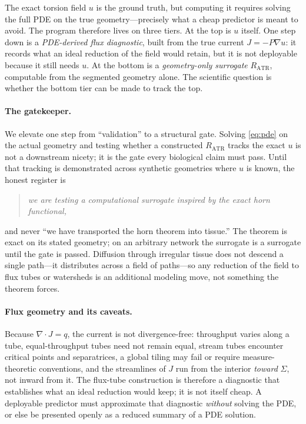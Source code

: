 \documentclass[11pt]{article}
\theoremstyle{remark}
\newcommand{\Sig}{\Sigma}
\newcommand{\RATR}{R_{\mathrm{ATR}}}
\begin{document}
The exact torsion field $u$ is the ground truth, but computing it requires solving
the full PDE on the true geometry---precisely what a cheap predictor is meant to
avoid. The program therefore lives on three tiers. At the top is $u$ itself. One
step down is a \emph{PDE-derived flux diagnostic}, built from the true current
$J=-P\nabla u$: it records what an ideal reduction of the field would retain, but
it is not deployable because it still needs $u$. At the bottom is a
\emph{geometry-only surrogate} $\RATR$, computable from the segmented geometry
alone. The scientific question is whether the bottom tier can be made to track the
top.

\paragraph{The gatekeeper.} We elevate one step from ``validation'' to a
structural gate. Solving \eqref{eq:pde} on the actual geometry and testing whether
a constructed $\RATR$ tracks the exact $u$ is not a downstream nicety; it is the
gate every biological claim must pass. Until that tracking is demonstrated across
synthetic geometries where $u$ is known, the honest register is
\begin{quote}
\emph{we are testing a computational surrogate inspired by the exact horn
functional,}
\end{quote}
and never ``we have transported the horn theorem into tissue.'' The theorem is
exact on its stated geometry; on an arbitrary network the surrogate is a surrogate
until the gate is passed. Diffusion through irregular tissue does not descend a
single path---it distributes across a field of paths---so any reduction of the
field to flux tubes or watersheds is an additional modeling move, not something
the theorem forces.

\paragraph{Flux geometry and its caveats.} Because $\nabla\!\cdot J=q$, the
current is not divergence-free: throughput varies along a tube, equal-throughput
tubes need not remain equal, stream tubes encounter critical points and
separatrices, a global tiling may fail or require measure-theoretic conventions,
and the streamlines of $J$ run from the interior \emph{toward} $\Sig$, not inward
from it. The flux-tube construction is therefore a diagnostic that establishes
what an ideal reduction would keep; it is not itself cheap. A deployable predictor
must approximate that diagnostic \emph{without} solving the PDE, or else be
presented openly as a reduced summary of a PDE solution.
\end{document}
